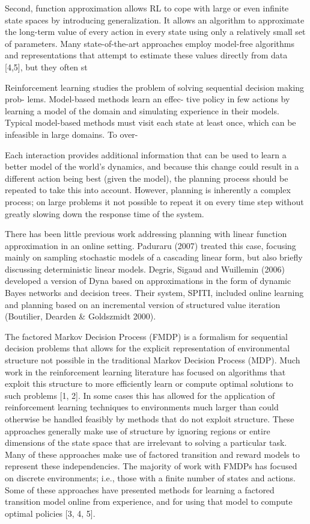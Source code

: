 Second, function approximation allows RL to cope with large or even infinite
state spaces by introducing generalization. It allows an algorithm to approximate
the long-term value of every action in every state using only a relatively
small set of parameters. Many state-of-the-art approaches employ model-free
algorithms and representations that attempt to estimate these values directly
from data [4,5], but they often st

Reinforcement learning studies the problem
of solving sequential decision making prob-
lems. Model-based methods learn an effec-
tive policy in few actions by learning a model
of the domain and simulating experience in
their models. Typical model-based methods
must visit each state at least once, which
can be infeasible in large domains. To over-

Each interaction provides additional
information that can be used to learn a better model of the
world’s dynamics, and because this change could result in a
different action being best (given the model), the planning
process should be repeated to take this into account. However,
planning is inherently a complex process; on large
problems it not possible to repeat it on every time step without
greatly slowing down the response time of the system.

\cite{approxModel}
There has been little previous work addressing planning
with linear function approximation in an online setting.
Paduraru (2007) treated this case, focusing mainly on sampling
stochastic models of a cascading linear form, but
also briefly discussing deterministic linear models. Degris,
Sigaud and Wuillemin (2006) developed a version of Dyna
based on approximations in the form of dynamic Bayes networks
and decision trees. Their system, SPITI, included
online learning and planning based on an incremental version
of structured value iteration (Boutilier, Dearden &
Goldszmidt 2000).

The factored Markov Decision Process (FMDP) is a formalism for sequential decision problems
that allows for the explicit representation of environmental structure not possible in the traditional
Markov Decision Process (MDP). Much work in the reinforcement learning literature has focused
on algorithms that exploit this structure to more efficiently learn or compute optimal solutions to
such problems [1, 2]. In some cases this has allowed for the application of reinforcement learning
techniques to environments much larger than could otherwise be handled feasibly by methods that
do not exploit structure. These approaches generally make use of structure by ignoring regions or
entire dimensions of the state space that are irrelevant to solving a particular task. Many of these
approaches make use of factored transition and reward models to represent these independencies.
The majority of work with FMDPs has focused on discrete environments; i.e., those with a finite
number of states and actions. Some of these approaches have presented methods for learning a
factored transition model online from experience, and for using that model to compute optimal
policies [3, 4, 5].

